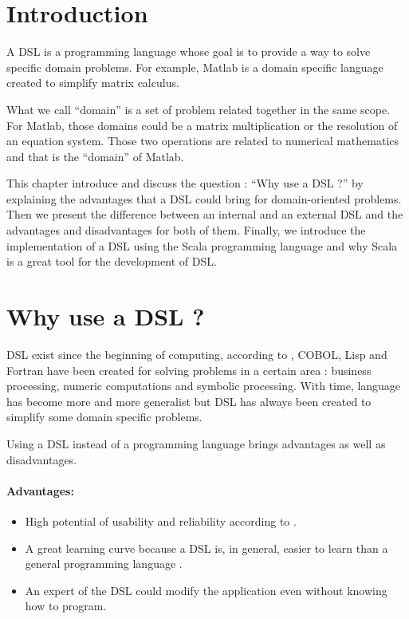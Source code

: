 \label{cha:a-dsl}

\section{Introduction}
\label{sec:dsl_intro}

A \gls{DSL} is a programming language whose goal is
to provide a way to solve specific domain problems. For example, Matlab is a
domain specific language created to simplify matrix calculus.

What we call ``domain'' is a set of problem related together in the same scope.
For Matlab, those domains could be a matrix multiplication or the resolution of an
equation system. Those two operations are related to numerical mathematics and
that is the ``domain'' of Matlab.

This chapter introduce and discuss the question : ``Why use a DSL ?'' by
explaining the advantages that a \gls{DSL} could bring for domain-oriented
problems. Then we present the difference between an internal and an external DSL
and the advantages and disadvantages for both of them. Finally, we introduce the
implementation of a \gls{DSL} using the Scala programming language and why Scala
is a great tool for the development of \gls{DSL}.

\section{Why use a DSL ?}
\label{sec:why-use-dsl}

\gls{DSL} exist since the beginning of computing, according to
\cite{VanDeursen2000}, COBOL, Lisp and Fortran have been
created for solving problems in a certain area : business processing, numeric
computations and symbolic processing. With time, language has become more and
more generalist but \gls{DSL} has always been created to simplify some domain
specific problems.

Using a DSL instead of a programming language brings advantages as well as
disadvantages.

\paragraph{Advantages:}
\begin{itemize}
\item High potential of usability and reliability according to
  \cite{Tolvanen2010}.
\item A great learning curve because a DSL is, in general, easier to learn than a
  general programming language \cite{Mernik2005}.
\item An expert of the DSL could modify the application even without knowing how
  to program.
\end{itemize}

